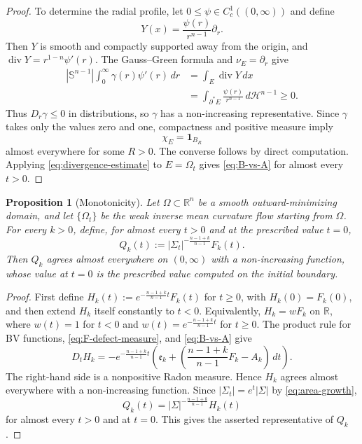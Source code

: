 \documentclass[10pt,a4paper]{amsart}
\numberwithin{equation}{section}
\newtheorem{proposition}[theorem]{Proposition}
\newcommand{\R}{\mathbb R}
\newcommand{\Sn}{\mathbb S}
\newcommand{\Om}{\Omega}
\newcommand{\Sig}{\Sigma}
\newcommand{\calH}{\mathcal H}
\newcommand{\diver}{\operatorname{div}}
\begin{document}
\begin{proof}
To determine the radial profile, let $0\leq\psi\in C_c^1((0,\infty))$ and define
\begin{equation*}
    Y(x)=\frac{\psi(r)}{r^{n-1}}\partial_r.
\end{equation*}
Then $Y$ is smooth and compactly supported away from the origin, and $\diver Y=r^{1-n}\psi'(r)$.  The Gauss--Green formula and $\nu_E=\partial_r$ give
\begin{align*}
    |\Sn^{n-1}|\int_0^\infty \gamma(r)\psi'(r)\,dr
    &=\int_E\diver Y\,dx\\
    &=\int_{\partial^*E}\frac{\psi(r)}{r^{n-1}}\,d\calH^{n-1}\geq0.
\end{align*}
Thus $D_r\gamma\leq0$ in distributions, so $\gamma$ has a non-increasing representative.  Since $\gamma$ takes only the values zero and one, compactness and positive measure imply
\begin{equation*}
    \chi_E=\mathbf 1_{B_R}
\end{equation*}
almost everywhere for some $R>0$.  The converse follows by direct computation.  Applying \eqref{eq:divergence-estimate} to $E=\Om_t$ gives \eqref{eq:B-vs-A} for almost every $t>0$.
\end{proof}

\begin{proposition}[Monotonicity]\label{prop:monotonicity}
Let $\Om\subset\R^n$ be a smooth outward-minimizing domain, and let $\{\Om_t\}$ be the weak inverse mean curvature flow starting from $\Om$. For every $k>0$, define, for almost every $t>0$ and at the prescribed value $t=0$,
\begin{equation*}
    Q_k(t):=|\Sig_t|^{-\frac{n-1+k}{n-1}}F_k(t).
\end{equation*}
Then $Q_k$ agrees almost everywhere on $(0,\infty)$ with a non-increasing function, whose value at $t=0$ is the prescribed value computed on the initial boundary.
\end{proposition}

\begin{proof}
First define $H_k(t):=e^{-\frac{n-1+k}{n-1} t}F_k(t)$ for $t\geq0$, with $H_k(0)=F_k(0)$, and then extend $H_k$ itself constantly to $t<0$. Equivalently, $H_k=wF_k$ on $\mathbb R$, where $w(t)=1$ for $t<0$ and $w(t)=e^{-\frac{n-1+k}{n-1} t}$ for $t\geq0$. The product rule for BV functions, \eqref{eq:F-defect-measure}, and \eqref{eq:B-vs-A} give
\begin{equation}\label{eq:Q-defect}
    D_tH_k
    =-e^{-\frac{n-1+k}{n-1} t}\left(
      \mathfrak e_k+\left(\frac{n-1+k}{n-1} F_k-A_k\right)\,dt\right).
\end{equation}
The right-hand side is a nonpositive Radon measure. Hence $H_k$ agrees almost everywhere with a non-increasing function. Since $|\Sig_t|=e^t|\Sig|$ by \eqref{eq:area-growth},
\begin{equation*}
    Q_k(t)=|\Sig|^{-\frac{n-1+k}{n-1}}H_k(t)
\end{equation*}
for almost every $t>0$ and at $t=0$.  This gives the asserted representative of $Q_k$.
\end{proof}
\end{document}
